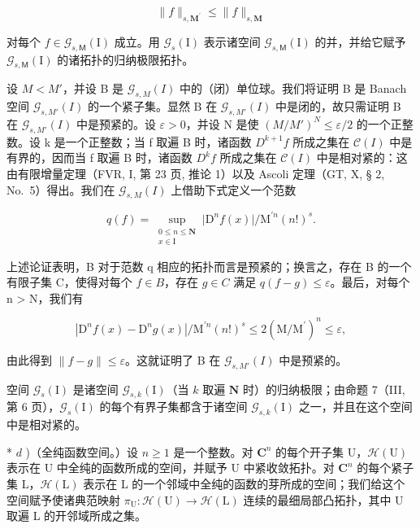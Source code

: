 \[
\| f \| _ {s, \mathbf {M} ^ {\prime}} \leqslant \| f \| _ {s, \mathbf {M}}
\]

对每个 \(f \in \mathcal{G}_{s,\mathsf{M}}(\mathrm{I})\) 成立。用 \(\mathcal{G}_s(\mathrm{I})\) 表示诸空间 \(\mathcal{G}_{s,\mathsf{M}}(\mathrm{I})\) 的并，并给它赋予 \(\mathcal{G}_{s,\mathsf{M}}(\mathrm{I})\) 的诸拓扑的归纳极限拓扑。

设 \(M < M'\)，并设 B 是 \(\mathcal{G}_{s,M}(I)\) 中的（闭）单位球。我们将证明 B 是 Banach 空间 \(\mathcal{G}_{s,M'}(I)\) 的一个紧子集。显然 B 在 \(\mathcal{G}_{s,M'}(I)\) 中是闭的，故只需证明 B 在 \(\mathcal{G}_{s,M'}(I)\) 中是预紧的。设 \(\varepsilon > 0\)，并设 N 是使 \((M/M')^N \leqslant \varepsilon/2\) 的一个正整数。设 k 是一个正整数；当 f 取遍 B 时，诸函数 \(D^{k+1}f\) 所成之集在 \(\mathcal{C}(I)\) 中是有界的，因而当 f 取遍 B 时，诸函数 \(D^k f\) 所成之集在 \(\mathcal{C}(I)\) 中是相对紧的：这由有限增量定理（FVR, I, 第 23 页, 推论 1）以及 Ascoli 定理（GT, X, § 2, No.~5）得出。我们在 \(\mathcal{G}_{s,M}(I)\) 上借助下式定义一个范数

\[
q(f) = \sup_{\substack{0\leqslant n\leqslant \mathbf{N}\\ x\in \mathrm{I}}}\big|\mathrm{D}^{n}f(x)\big| / \mathrm{M}^{\prime n}(n!)^{s}  .
\]

上述论证表明，B 对于范数 q 相应的拓扑而言是预紧的；换言之，存在 B 的一个有限子集 C，使得对每个 \(f \in B\)，存在 \(g \in C\) 满足 \(q(f - g) \leqslant \varepsilon\)。最后，对每个 n \textgreater{} N，我们有

\[
\left| \mathrm{D} ^ {n} f (x) - \mathrm{D} ^ {n} g (x) \right| / \mathrm{M} ^ {\prime n} (n!) ^ {s} \leqslant 2 (\mathrm{M} / \mathrm{M} ^ {\prime}) ^ {n} \leqslant \varepsilon ,
\]

由此得到 \(\| f - g\| \leqslant \varepsilon\)。这就证明了 B 在 \(\mathcal{G}_{s,M'}(I)\) 中是预紧的。

空间 \(\mathcal{G}_s(\mathrm{I})\) 是诸空间 \(\mathcal{G}_{s,k}(\mathrm{I})\)（当 \(k\) 取遍 \(\mathbf{N}\) 时）的归纳极限；由命题 7（III, 第 6 页），\(\mathcal{G}_s(\mathrm{I})\) 的每个有界子集都含于诸空间 \(\mathcal{G}_{s,k}(\mathrm{I})\) 之一，并且在这个空间中是相对紧的。

* \(d\) )（全纯函数空间。）设 \(n \geqslant 1\) 是一个整数。对 \(\mathbf{C}^n\) 的每个开子集 U，\(\mathcal{H}(\mathrm{U})\) 表示在 U 中全纯的函数所成的空间，并赋予 U 中紧收敛拓扑。对 \(\mathbf{C}^n\) 的每个紧子集 L，\(\mathcal{H}(\mathrm{L})\) 表示在 L 的一个邻域中全纯的函数的芽所成的空间；我们给这个空间赋予使诸典范映射 \(\pi_{\mathrm{U}}:\mathcal{H}(\mathrm{U})\to\mathcal{H}(\mathrm{L})\) 连续的最细局部凸拓扑，其中 U 取遍 L 的开邻域所成之集。

